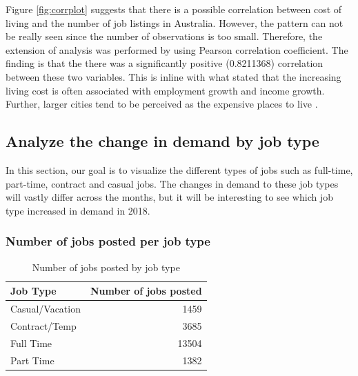 \documentclass[11pt,a4paper,]{article}
\begin{document}
Figure \ref{fig:corrplot} suggests that there is a possible correlation between cost of living and the number of job listings in Australia. However, the pattern can not be really seen since the number of observations is too small. Therefore, the extension of analysis was performed by using Pearson correlation coefficient. The finding is that the there was a significantly positive (0.8211368) correlation between these two variables. This is inline with what \textcite{DePietro} stated that the increasing living cost is often associated with employment growth and income growth. Further, larger cities tend to be perceived as the expensive places to live \autocite{Weinstein}.

\hypertarget{analyze-the-change-in-demand-by-job-type}{%
\subsection{Analyze the change in demand by job type}\label{analyze-the-change-in-demand-by-job-type}}

In this section, our goal is to visualize the different types of jobs such as full-time, part-time, contract and casual jobs. The changes in demand to these job types will vastly differ across the months, but it will be interesting to see which job type increased in demand in 2018.

\hypertarget{number-of-jobs-posted-per-job-type}{%
\subsubsection{Number of jobs posted per job type}\label{number-of-jobs-posted-per-job-type}}

\begin{table}

\caption{\label{tab:job-type-counts}Number of jobs posted by job type}
\centering
\begin{tabular}[t]{l|r}
\hline
Job Type & Number of jobs posted\\
\hline
Casual/Vacation & 1459\\
\hline
Contract/Temp & 3685\\
\hline
Full Time & 13504\\
\hline
Part Time & 1382\\
\hline
\end{tabular}
\end{table}
\end{document}
